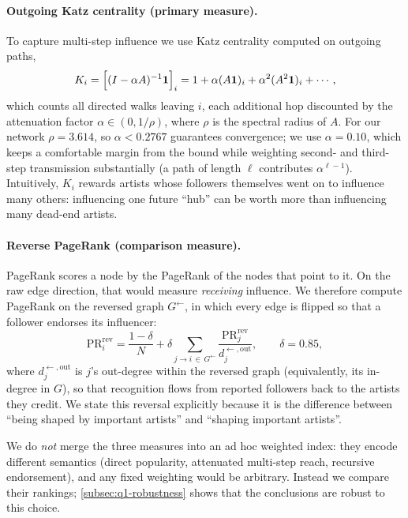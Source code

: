 \paragraph{Outgoing Katz centrality (primary measure).}
To capture multi-step influence we use Katz centrality computed on outgoing
paths,
\begin{equation}\label{eq:katz}
K_i=\Bigl[(I-\alpha A)^{-1}\mathbf{1}\Bigr]_i
   =1+\alpha (A\mathbf{1})_i+\alpha^2(A^2\mathbf{1})_i+\cdots,
\end{equation}
which counts all directed walks leaving \(i\), each additional hop discounted
by the attenuation factor \(\alpha\in(0,1/\rho)\), where \(\rho\) is the
spectral radius of \(A\). For our network \(\rho=3.614\), so
\(\alpha<0.2767\) guarantees convergence; we use \(\alpha=0.10\), which keeps
a comfortable margin from the bound while weighting second- and third-step
transmission substantially (a path of length \(\ell\) contributes
\(\alpha^{\ell-1}\)). Intuitively, \(K_i\) rewards artists whose followers
themselves went on to influence many others: influencing one future
``hub'' can be worth more than influencing many dead-end artists.

\paragraph{Reverse PageRank (comparison measure).}
PageRank scores a node by the PageRank of the nodes that point to it. On the
raw edge direction, that would measure \emph{receiving} influence. We therefore
compute PageRank on the reversed graph \(G^{\leftarrow}\), in which every edge
is flipped so that a follower endorses its influencer:
\begin{equation}\label{eq:rpr}
\mathrm{PR}^{\text{rev}}_i=\frac{1-\delta}{N}
 +\delta\sum_{j\to i\,\in\,G^{\leftarrow}}\frac{\mathrm{PR}^{\text{rev}}_j}{d_j^{\leftarrow,\text{out}}},
 \qquad \delta=0.85,
\end{equation}
where \(d_j^{\leftarrow,\text{out}}\) is \(j\)'s out-degree within the
reversed graph (equivalently, its in-degree in \(G\)), so that recognition
flows from reported followers back to the artists they credit. We state
this reversal explicitly because it is the difference between
``being shaped by important artists'' and ``shaping important artists''.

We do \emph{not} merge the three measures into an ad hoc weighted index:
they encode different semantics (direct popularity, attenuated multi-step
reach, recursive endorsement), and any fixed weighting would be arbitrary.
Instead we compare their rankings; \cref{subsec:q1-robustness} shows that the
conclusions are robust to this choice.

